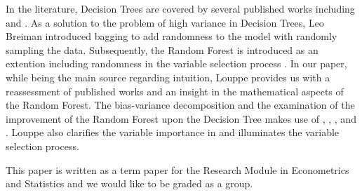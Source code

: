 In the literature, 
Decision Trees are covered by several published works including 
\cite{breiman1984classification} and \cite{James2013}.
As a solution to the problem of high variance in Decision Trees, 
Leo Breiman introduced bagging to add randomness to the model 
with randomly sampling the data\cite{breiman1996bagging}. 
Subsequently, the Random Forest is introduced as an extention including
randomness in the variable selection process \cite{breiman2001random}. 
In our paper, while \cite{friedman2001elements} being the main source regarding intuition,
Louppe provides us with a reassessment of published works and an insight in 
the mathematical aspects of the Random Forest\cite{louppe2014understanding}.
The bias-variance decomposition and the examination of 
the improvement of the Random Forest upon the Decision Tree makes use of
\cite{james2003variance}, \cite{domingos2000decomposition}, \cite{friedman1997zeroLoss}, and \cite{kohavi1996bias}. 
Louppe also clarifies the variable importance in \cite{louppe2013understanding} and 
\cite{kohavi1997importance} illuminates the variable selection process.

This paper is written as a term paper for the Research Module in Econometrics and Statistics and 
we would like to be graded as a group.
